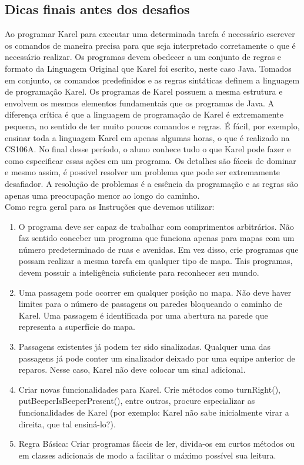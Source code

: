 \documentclass[a4paper,11pt]{article}
\begin{document}
\subsection{Dicas finais antes dos desafios}
Ao programar Karel para executar uma determinada tarefa é necessário escrever os comandos de maneira precisa para que seja interpretado corretamente o que é necessário realizar. Os programas devem obedecer a um conjunto de regras e formato da Linguagem Original que Karel foi escrito, neste caso Java. Tomados em conjunto, os comandos predefinidos e as regras sintáticas definem a linguagem de programação Karel. Os programas de Karel possuem a mesma estrutura e envolvem os mesmos elementos fundamentais que os programas de Java. A diferença crítica é que a linguagem de programação de Karel é extremamente pequena, no sentido de ter muito poucos comandos e regras. É fácil, por exemplo, ensinar toda a linguagem Karel em apenas algumas horas, o que é realizado na CS106A. No final desse período, o aluno conhece tudo o que Karel pode fazer e como especificar essas ações em um programa. Os detalhes são fáceis de dominar e mesmo assim, é possivel resolver um problema que pode ser extremamente desafiador. A resolução de problemas é a essência da programação e as regras são apenas uma preocupação menor ao longo do caminho. \\[3mm]
Como regra geral para as Instruções que devemos utilizar:
\begin{enumerate}
  \item O programa deve ser capaz de trabalhar com comprimentos arbitrários. Não faz sentido conceber um programa que funciona apenas para mapas com um número predeterminado de ruas e avenidas. Em vez disso, crie programas que possam realizar a mesma tarefa em qualquer tipo de mapa. Tais programas, devem possuir a inteligência suficiente para reconhecer seu mundo.
  \item Uma passagem pode ocorrer em qualquer posição no mapa. Não deve haver limites para o número de passagens ou paredes bloqueando o caminho de Karel. Uma passagem é identificada por uma abertura na parede que representa a superfície do mapa.
  \item Passagens existentes já podem ter sido sinalizadas. Qualquer uma das passagens já pode conter um sinalizador deixado por uma equipe anterior de reparos. Nesse caso, Karel não deve colocar um sinal adicional.
  \item Criar novas funcionalidades para Karel. Crie métodos como turnRight(), putBeeperIsBeeperPresent(), entre outros, procure especializar as funcionalidades de Karel (por exemplo: Karel não sabe inicialmente virar a direita, que tal ensiná-lo?). 
  \item Regra Básica: Criar programas fáceis de ler, divida-os em curtos métodos ou em classes adicionais de modo a facilitar o máximo possível sua leitura.
\end{enumerate}
\end{document}
